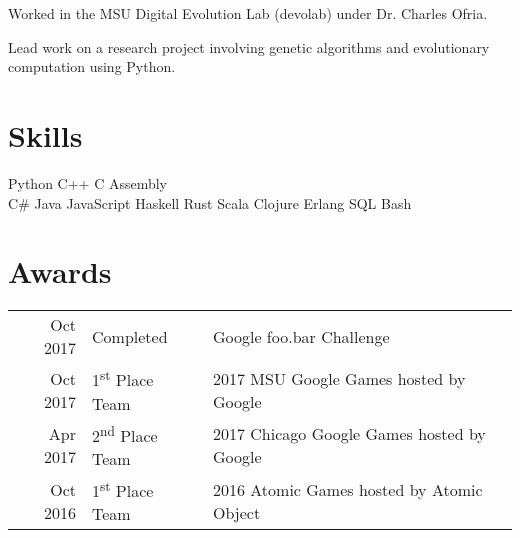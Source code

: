\documentclass[]{deedy-resume-openfont}
\begin{document}
\begin{minipage}[t]{0.66\textwidth}
\begin{tightemize}
\item Worked in the MSU Digital Evolution Lab (devolab) under Dr. Charles Ofria.
\item Lead work on a research project involving genetic algorithms and evolutionary computation using Python.
\end{tightemize}
\sectionsep


\section{Skills}
Python \textbullet{} C++ \textbullet{} C \textbullet{} Assembly\\
C\# \textbullet{} Java \textbullet{} JavaScript \textbullet{} Haskell \textbullet{} Rust \textbullet{}
Scala \textbullet{} Clojure \textbullet{} Erlang \textbullet{} SQL \textbullet{} Bash\\
\sectionsep


\section{Awards}

\begin{tabular}{rll}
Oct 2017 & Completed & Google foo.bar Challenge\\
Oct 2017 & 1\textsuperscript{st} Place Team & 2017 MSU Google Games hosted by Google\\
Apr 2017 & 2\textsuperscript{nd} Place Team & 2017 Chicago Google Games hosted by Google\\
Oct 2016 & 1\textsuperscript{st} Place Team & 2016 Atomic Games hosted by Atomic Object\\
\end{tabular}
\sectionsep



\end{minipage}
\end{document}

